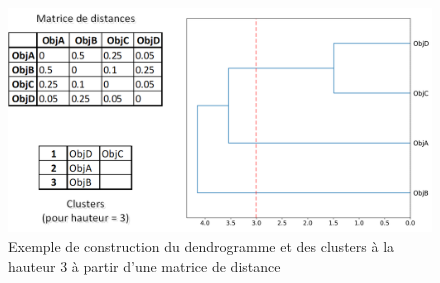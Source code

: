 \bigskip

\begin{figure}[ht]
\centering
\centerline{  %
\includegraphics[scale=1]{2-Etat-de-l'Art/images/Clustering/CAH-exemple2.png}
}
\caption{Exemple de construction du dendrogramme et des clusters à la hauteur 3 à partir d'une matrice de distance}
\label{figure:2-S2-Exemple-CAH-Dendrogramme-2}
\end{figure}






\clearpage %
\newpage   %



